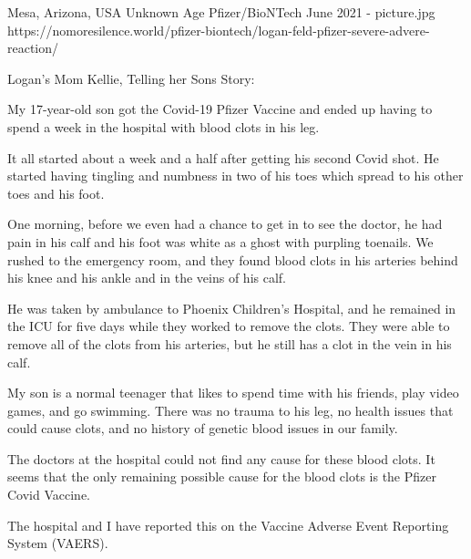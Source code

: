 {Mesa, Arizona, USA}
{Unknown Age}
{Pfizer/BioNTech}
{June 2021}
{-}
{picture.jpg}
{https://nomoresilence.world/pfizer-biontech/logan-feld-pfizer-severe-advere-reaction/}
{


Logan’s Mom Kellie, Telling her Sons Story:

My 17-year-old son got the Covid-19 Pfizer Vaccine and ended up having to spend a week in the hospital with blood clots in his leg.

It all started about a week and a half after getting his second Covid shot. He started having tingling and numbness in two of his toes which spread to his other toes and his foot.

One morning, before we even had a chance to get in to see the doctor, he had pain in his calf and his foot was white as a ghost with purpling toenails. We rushed to the emergency room, and they found blood clots in his arteries behind his knee and his ankle and in the veins of his calf.

He was taken by ambulance to Phoenix Children’s Hospital, and he remained in the ICU for five days while they worked to remove the clots. They were able to remove all of the clots from his arteries, but he still has a clot in the vein in his calf.

My son is a normal teenager that likes to spend time with his friends, play video games, and go swimming. There was no trauma to his leg, no health issues that could cause clots, and no history of genetic blood issues in our family.

The doctors at the hospital could not find any cause for these blood clots. It seems that the only remaining possible cause for the blood clots is the Pfizer Covid Vaccine.

The hospital and I have reported this on the Vaccine Adverse Event Reporting System (VAERS).
}
